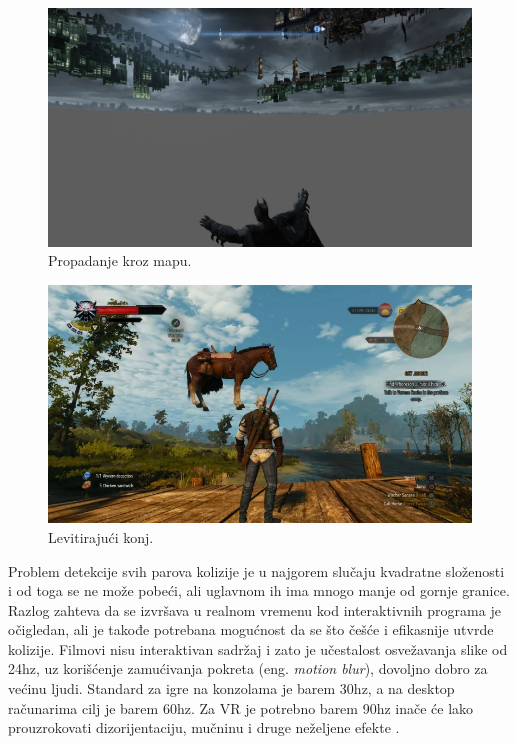 \documentclass[12pt,oneside]{memoir}
\begin{document}
\begin{figure}[h!]
\centering
\includegraphics[scale=0.22]{batman.jpg}
\caption{Propadanje kroz mapu.}
\label{fig:batman}
\end{figure}

\begin{figure}[h!]
	\centering
	\includegraphics[scale=0.54]{horse.png}
	\caption{Levitirajući konj.}
	\label{fig:horse}
\end{figure}

Problem detekcije svih parova kolizije je u najgorem slučaju kvadratne složenosti i od toga se ne može pobeći,
ali uglavnom ih ima mnogo manje od gornje granice.
Razlog zahteva da se izvršava u realnom vremenu kod interaktivnih programa je očigledan, ali je takođe
potrebana mogućnost da se što češće i efikasnije utvrde kolizije. Filmovi nisu interaktivan sadržaj i zato
je učestalost osvežavanja slike od 24hz, uz korišćenje zamućivanja pokreta (eng. {\em motion blur}),
dovoljno dobro za većinu ljudi. Standard za igre na konzolama je barem 30hz, a na desktop računarima 
cilj je barem 60hz. Za VR je potrebno barem 90hz inače će lako prouzrokovati dizorijentaciju, mučninu i druge
neželjene efekte \cite{importance}.
\end{document}

